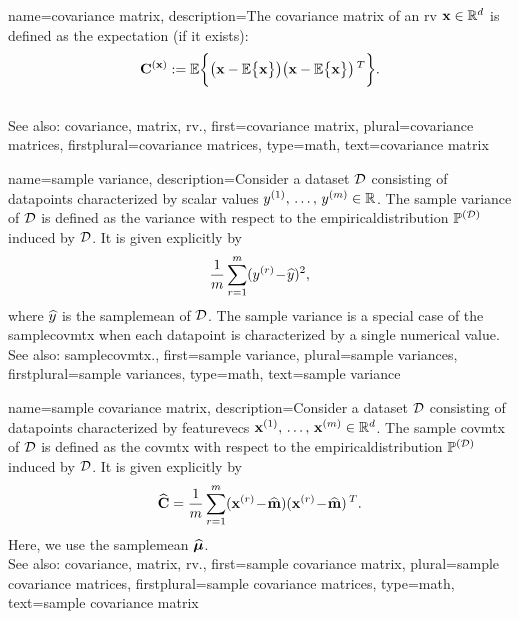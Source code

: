 {name={covariance matrix}, 
	description={The \gls{covariance} \gls{matrix} of 
		an \gls{rv} ${\bf x} \in \mathbb{R}^{d}$ is defined as 
		the \gls{expectation} (if it exists):
		$$\mathbf{C}^{({\bf x})} := \mathbb{E} \bigg \{ \big( {\bf x} - \mathbb{E} \big\{ {\bf x} \big\} \big)  
		\big({\bf x} - \mathbb{E} \big\{ {\bf x} \big\} \big)\,^{T} \bigg\}.$$
				\\
		See also: \gls{covariance}, \gls{matrix}, \gls{rv}.},
	first={covariance matrix},
	plural={covariance matrices},
	firstplural={covariance matrices},
	type=math, 
	text={covariance matrix} 
}

{name={sample variance}, 
	description={Consider a \gls{dataset} $\mathcal{D}$ consisting of \glspl{datapoint} 
		characterized by scalar values $y^{(1)}, \,\ldots, \,y^{(m)} 
		\in \mathbb{R}$. The \gls{sample} \gls{variance} of $\mathcal{D}$ 
		is defined as the \gls{variance} with respect to the \gls{empiricaldistribution} 
		$\mathbb{P}^{(\mathcal{D})}$ induced by $\mathcal{D}$. It is given explicitly by 
		$$\frac{1}{m} \sum_{r=1}^{m} (y^{(r)}\!-\!\widehat{y})^2,$$ 
		where $\widehat{y}$ is the \gls{samplemean} of $\mathcal{D}$. The 
		\gls{sample} \gls{variance} is a special case of the \gls{samplecovmtx} 
		when each \gls{datapoint} is characterized by a single numerical value.
		\\
		See also: \gls{samplecovmtx}.},
	first={sample variance},
	plural={sample variances},
	firstplural={sample variances},
	type=math, 
	text={sample variance}
}

{name={sample covariance matrix}, 
	description={Consider a \gls{dataset} $\mathcal{D}$ consisting of \glspl{datapoint} 
		characterized by \glspl{featurevec} ${\bf x}^{(1)}, \,\ldots, \,{\bf x}^{(m)} \in \mathbb{R}^{d}$.	
		The \gls{sample} \gls{covmtx} 
		of $\mathcal{D}$ is defined as the \gls{covmtx} with 
		respect to the \gls{empiricaldistribution} $\mathbb{P}^{(\mathcal{D})}$ 
		induced by $\mathcal{D}$. It is given explicitly by 
		$$\widehat{{\bf C}} = \frac{1}{m} \sum_{r=1}^{m} ({\bf x}^{(r)}\!-\!\widehat{{\bf m}}) ({\bf x}^{(r)}\!-\!\widehat{{\bf m}})\,^{T}.$$ 
		Here, we use the \gls{samplemean} $\widehat{\bm \mu}$. 
		\\
		See also: \gls{covariance}, \gls{matrix}, \gls{rv}.},
	first={sample covariance matrix},
	plural={sample covariance matrices},
	firstplural={sample covariance matrices},
	type=math, 
	text={sample covariance matrix} 
}

